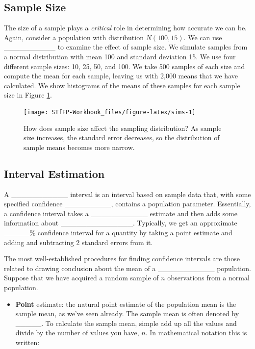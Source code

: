 \documentclass[]{book}
\providecommand{\tightlist}{%
  \setlength{\itemsep}{0pt}\setlength{\parskip}{0pt}}
\theoremstyle{definition}
\theoremstyle{definition}
\theoremstyle{remark}
\begin{document}
\subsection{Sample Size}\label{sample-size}

The size of a sample plays a \emph{critical} role in determining how
accurate we can be. Again, consider a population with distribution
\(N(100,15)\). We can use \_\_\_\_\_\_\_\_\_\_ to examine the effect of
sample size. We simulate samples from a normal distribution with mean
100 and standard deviation 15. We use four different sample sizes: 10,
25, 50, and 100. We take 500 samples of each size and compute the mean
for each sample, leaving us with 2,000 means that we have calculated. We
show histograms of the means of these samples for each sample size in
Figure \ref{fig:sims}.

\begin{figure}[h]

{\centering \texttt{[image: STfFP-Workbook\_files/figure-latex/sims-1]} 

}

\caption{How does sample size affect the sampling distribution? As sample size increases, the standard error decreases, so the distribution of sample means becomes more narrow.}\label{fig:sims}
\end{figure}

\subsection{Interval Estimation}\label{interval-estimation}

A \_\_\_\_\_\_\_\_\_\_\_ interval is an interval based on sample data
that, with some specified confidence \_\_\_\_\_\_\_\_\_, contains a
population parameter. Essentially, a confidence interval takes a
\_\_\_\_\_\_\_\_\_\_\_ estimate and then adds some information about
\_\_\_\_\_\_\_\_\_\_\_\_\_\_. Typically, we get an approximate
\_\_\_\_\_\% confidence interval for a quantity by taking a point
estimate and adding and subtracting 2 standard errors from it.

The most well-established procedures for finding confidence intervals
are those related to drawing conclusion about the mean of a
\_\_\_\_\_\_\_\_\_\_\_ population. Suppose that we have acquired a
random sample of \(n\) observations from a normal population.

\begin{itemize}
\tightlist
\item
  \textbf{Point} estimate: the natural point estimate of the population
  mean is the sample mean, as we've seen already. The sample mean is
  often denoted by \_\_\_\_\_. To calculate the sample mean, simple add
  up all the values and divide by the number of values you have, \(n\).
  In mathematical notation this is written:
\end{itemize}
\end{document}
